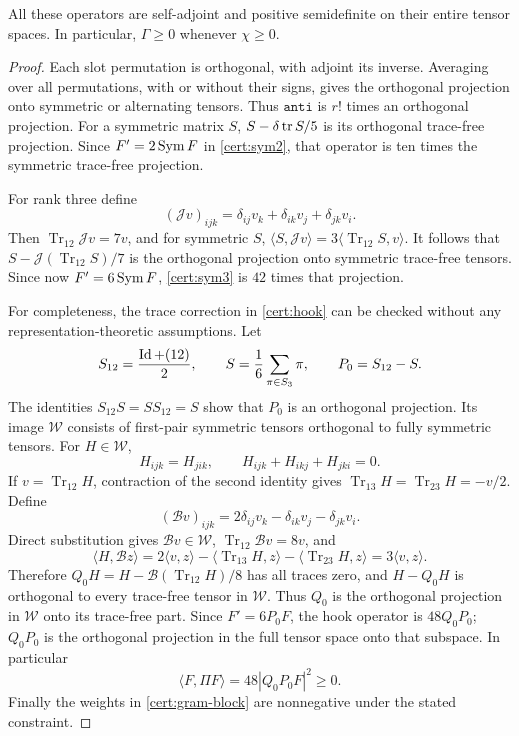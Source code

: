 \begin{lemma}\label{cert:positive-projections}
All these operators are self-adjoint and positive semidefinite on their
entire tensor spaces.  In particular, $\Gamma\ge0$ whenever $\chi\ge0$.
\end{lemma}
\begin{proof}
Each slot permutation is orthogonal, with adjoint its inverse.  Averaging
over all permutations, with or without their signs, gives the orthogonal
projection onto symmetric or alternating tensors.  Thus $\texttt{anti}$ is
$r!$ times an orthogonal projection.  For a symmetric matrix $S$,
$S-\delta\operatorname{tr} S/5$ is its orthogonal trace-free projection.  Since $F'=2\operatorname{Sym} F$
in \eqref{cert:sym2}, that operator is ten times the symmetric trace-free
projection.

For rank three define
\[
 (\mathcal Jv)_{ijk}=\delta_{ij}v_k+\delta_{ik}v_j+\delta_{jk}v_i.
\]
Then $\operatorname{Tr}_{12}\mathcal Jv=7v$, and for symmetric $S$,
$\langle S,\mathcal Jv\rangle=3\langle\operatorname{Tr}_{12}S,v\rangle$.
It follows that $S-\mathcal J(\operatorname{Tr}_{12}S)/7$ is the orthogonal
projection onto symmetric trace-free tensors.  Since now $F'=6\operatorname{Sym} F$,
\eqref{cert:sym3} is $42$ times that projection.

For completeness, the trace correction in \eqref{cert:hook} can be checked
without any representation-theoretic assumptions.  Let
\[
 S_{12}=\frac{\operatorname{Id}+(12)}2,\qquad
 S=\frac16\sum_{\pi\in S_3}\pi,\qquad P_0=S_{12}-S.
\]
The identities $S_{12}S=SS_{12}=S$ show that $P_0$ is an orthogonal
projection.  Its image $\mathcal W$ consists of first-pair symmetric tensors
orthogonal to fully symmetric tensors.  For $H\in\mathcal W$,
\[
 H_{ijk}=H_{jik},\qquad H_{ijk}+H_{ikj}+H_{jki}=0.
\]
If $v=\operatorname{Tr}_{12}H$, contraction of the second identity gives
$\operatorname{Tr}_{13}H=\operatorname{Tr}_{23}H=-v/2$.
Define
\[
 (\mathcal Bv)_{ijk}=2\delta_{ij}v_k-\delta_{ik}v_j-\delta_{jk}v_i.
\]
Direct substitution gives $\mathcal Bv\in\mathcal W$,
$\operatorname{Tr}_{12}\mathcal Bv=8v$, and
\[
 \langle H,\mathcal Bz\rangle
 =2\langle v,z\rangle
  -\langle\operatorname{Tr}_{13}H,z\rangle
  -\langle\operatorname{Tr}_{23}H,z\rangle
 =3\langle v,z\rangle.
\]
Therefore $Q_0H=H-\mathcal B(\operatorname{Tr}_{12}H)/8$ has all traces
zero, and $H-Q_0H$ is orthogonal to every trace-free tensor in $\mathcal W$.
Thus $Q_0$ is the orthogonal projection in $\mathcal W$ onto its trace-free
part.  Since $F'=6P_0F$, the hook operator is $48Q_0P_0$; $Q_0P_0$ is the
orthogonal projection in the full tensor space onto that subspace.  In
particular
\[
 \langle F,\Pi F\rangle=48|Q_0P_0F|^2\ge0.
\]
Finally the weights in \eqref{cert:gram-block} are nonnegative under the stated
constraint.
\end{proof}

